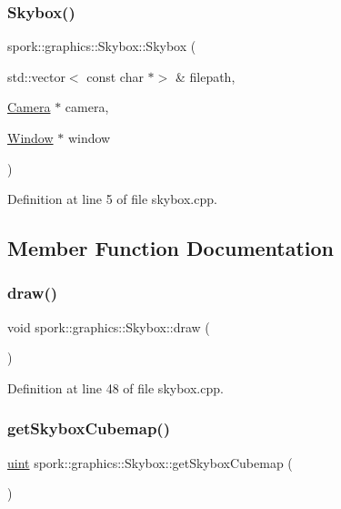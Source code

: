 \subsubsection{\texorpdfstring{Skybox()}{Skybox()}}
{\footnotesize\ttfamily spork\+::graphics\+::\+Skybox\+::\+Skybox (\begin{DoxyParamCaption}\item[{std\+::vector$<$ const char $\ast$$>$ \&}]{filepath,  }\item[{\hyperlink{classspork_1_1graphics_1_1_camera}{Camera} $\ast$}]{camera,  }\item[{\hyperlink{classspork_1_1graphics_1_1_window}{Window} $\ast$}]{window }\end{DoxyParamCaption})}



Definition at line 5 of file skybox.\+cpp.



\subsection{Member Function Documentation}
\mbox{\label{classspork_1_1graphics_1_1_skybox_ab9f043ba99ee8325ba201997f7868194}} 
\subsubsection{\texorpdfstring{draw()}{draw()}}
{\footnotesize\ttfamily void spork\+::graphics\+::\+Skybox\+::draw (\begin{DoxyParamCaption}{ }\end{DoxyParamCaption})}



Definition at line 48 of file skybox.\+cpp.

\mbox{\label{classspork_1_1graphics_1_1_skybox_af88b8c35f618c700a2aeb3db8b708154}} 
\subsubsection{\texorpdfstring{get\+Skybox\+Cubemap()}{getSkyboxCubemap()}}
{\footnotesize\ttfamily \hyperlink{defines_8h_a91ad9478d81a7aaf2593e8d9c3d06a14}{uint} spork\+::graphics\+::\+Skybox\+::get\+Skybox\+Cubemap (\begin{DoxyParamCaption}{ }\end{DoxyParamCaption})\hspace{0.3cm}{\ttfamily [inline]}}



